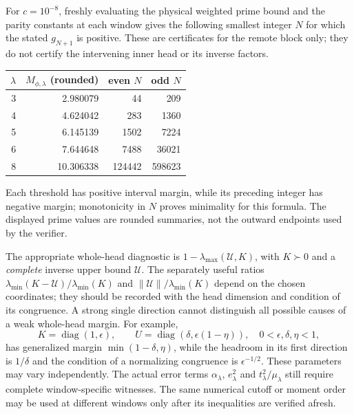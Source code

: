 \documentclass[11pt]{article}
\theoremstyle{remark}
\begin{document}
For $c=10^{-8}$, freshly evaluating the physical weighted prime bound
and the parity constants at each window gives the following smallest
integer $N$ for which the stated $g_{N+1}$ is positive.  These are
certificates for the remote block only; they do not certify the
intervening inner head or its inverse factors.
\begin{center}
\begin{tabular}{rrrr}
\toprule
$\lambda$ & $M_{\phi,\lambda}$ (rounded) & even $N$ & odd $N$\\
\midrule
3&2.980079&44&209\\
4&4.624042&283&1360\\
5&6.145139&1502&7224\\
6&7.644648&7488&36021\\
8&10.306338&124442&598623\\
\bottomrule
\end{tabular}
\end{center}
Each threshold has positive interval margin, while its preceding
integer has negative margin; monotonicity in $N$ proves minimality
for this formula.  The displayed prime values are rounded summaries,
not the outward endpoints used by the verifier.

The appropriate whole-head diagnostic is
$1-\lambda_{\max}(\mathcal U,K)$, with $K\succ0$ and a
\emph{complete} inverse upper bound $\mathcal U$.  The separately
useful ratios $\lambda_{\min}(K-\mathcal U)/\lambda_{\min}(K)$ and
$\|\mathcal U\|/\lambda_{\min}(K)$ depend on the chosen coordinates;
they should be recorded with the head dimension and condition of
its congruence.  A strong single direction cannot distinguish all
possible causes of a weak whole-head margin.  For example,
\[
 K=\operatorname{diag}(1,\epsilon),\qquad
 U=\operatorname{diag}(\delta,\epsilon(1-\eta)),
 \quad 0<\epsilon,\delta,\eta<1,
\]
has generalized margin $\min(1-\delta,\eta)$, while the headroom
in its first direction is $1/\delta$ and the condition of a
normalizing congruence is $\epsilon^{-1/2}$.  These parameters
may vary independently.  The actual error terms
$\alpha_\lambda$, $e_\lambda^2$ and $t_\lambda^2/\mu_\lambda$
still require complete window-specific witnesses.  The same
numerical cutoff or moment order may be used at different windows
only after its inequalities are verified afresh.
\end{document}
